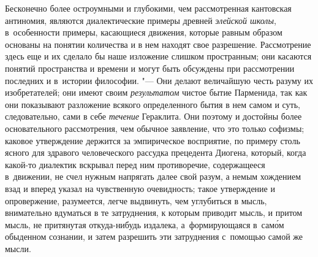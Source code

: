 Бесконечно более остроумными и глубокими, чем рассмотренная кантовская
антиномия, являются диалектические примеры древней {\em элейской школы},
в~особенности примеры, касающиеся движения, которые равным образом основаны
на понятии количества и в нем находят свое разрешение. Рассмотрение здесь
еще и их сделало бы наше изложение слишком пространным; они касаются понятий
пространства и времени и могут быть обсуждены при рассмотрении последних и
в~истории философии. "--- Они делают величайшую честь разуму их изобретателей;
они имеют своим {\em результатом} чистое бытие Парменида, так как они
показывают разложение всякого определенного бытия в нем самом и суть,
следовательно, сами в себе {\em течение} Гераклита. Они поэтому и достойны
более основательного рассмотрения, чем обычное заявление, что это только
софизмы; каковое утверждение держится за эмпирическое восприятие, по примеру
столь ясного для здравого человеческого рассудка прецедента Диогена, который,
когда какой-то диалектик вскрывал перед ним противоречие, содержащееся
в~движении, не счел нужным напрягать далее свой разум, а немым хождением взад
и вперед указал на чувственную очевидность; такое утверждение и опровержение,
разумеется, легче выдвинуть, чем углубиться в мысль, внимательно вдуматься
в те затруднения, к которым приводит мысль, и притом мысль, не притянутая
откуда-нибудь издалека, а~формирующаяся в~сам\'{о}м обыденном сознании,
и затем разрешить эти затруднения с~помощью самой же мысли.

